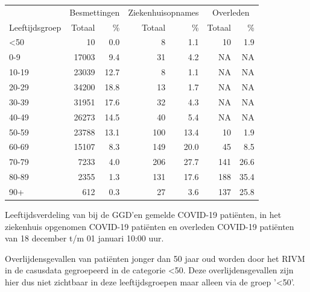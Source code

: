 \documentclass[
  english,
  man,floatsintext]{apa6}
\begin{document}
\begin{table}
\centering\begingroup\fontsize{11}{13}\selectfont

\begin{threeparttable}
\begin{tabular}{lrrrrrr}
\toprule
\multicolumn{1}{c}{ } & \multicolumn{2}{c}{Besmettingen} & \multicolumn{2}{c}{Ziekenhuisopnames} & \multicolumn{2}{c}{Overleden} \\
\cmidrule(l{3pt}r{3pt}){2-3} \cmidrule(l{3pt}r{3pt}){4-5} \cmidrule(l{3pt}r{3pt}){6-7}
Leeftijdsgroep & Totaal & \% & Totaal & \% & Totaal & \%\\
\midrule
<50 & 10 & 0.0 & 8 & 1.1 & 10 & 1.9\\
0-9 & 17003 & 9.4 & 31 & 4.2 & NA & NA\\
10-19 & 23039 & 12.7 & 8 & 1.1 & NA & NA\\
20-29 & 34200 & 18.8 & 13 & 1.7 & NA & NA\\
30-39 & 31951 & 17.6 & 32 & 4.3 & NA & NA\\
40-49 & 26273 & 14.5 & 40 & 5.4 & NA & NA\\
50-59 & 23788 & 13.1 & 100 & 13.4 & 10 & 1.9\\
60-69 & 15107 & 8.3 & 149 & 20.0 & 45 & 8.5\\
70-79 & 7233 & 4.0 & 206 & 27.7 & 141 & 26.6\\
80-89 & 2355 & 1.3 & 131 & 17.6 & 188 & 35.4\\
90+ & 612 & 0.3 & 27 & 3.6 & 137 & 25.8\\
\bottomrule
\end{tabular}
\begin{tablenotes}
\item[1] Leeftijdsverdeling van bij de GGD’en gemelde COVID-19 patiënten, in het ziekenhuis opgenomen COVID-19 patiënten en overleden COVID-19 patiënten van 18 december t/m 01 januari 10:00 uur.
\item[2] Overlijdensgevallen van patiënten jonger dan 50 jaar oud worden door het RIVM in de casusdata gegroepeerd in de categorie <50. Deze overlijdensgevallen zijn hier dus niet zichtbaar in deze leeftijdsgroepen maar alleen via de groep '<50'.
\end{tablenotes}
\end{threeparttable}
\endgroup{}
\end{table}

\newpage
\end{document}
